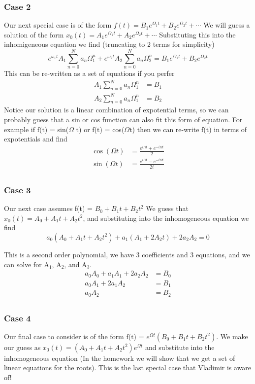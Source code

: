 \documentclass{article}
\newcommand{\be}{\begin{equation}}
\newcommand{\ee}{\end{equation}}
\begin{document}
\subsubsection*{Case 2}
Our next special case is of the form $f(t) = B_1e^{\Omega_1t} + B_2e^{\Omega_2t} + \cdots$
We will guess a solution of the form $x_0(t) = A_1 e^{\Omega_1t} + A_2 e^{\Omega_2t} + \cdots$
Substituting this into the inhomigeneous equation we find  (truncating to 2 terms for simplicity)
\be
e^{\omega_1t} A_1\sum_{n=0}^N a_n \Omega_1^n + e^{\omega_2t} A_2\sum_{n=0}^N a_n \Omega_2^n = B_1e^{\Omega_1 t} + B_2 e^{\Omega_2 t}
\ee
This can be re-written as a set of equations if you perfer
\be
\begin{split}
    A_1 \sum_{n=0}^N a_n\Omega_1^n &= B_1\\
    A_2 \sum_{n=0}^N a_n\Omega_1^n &= B_2
\end{split}
\ee
Notice our solution is a linear combination of expotential terms, so we can probably guess that a sin or cos function can also fit this form of equation.
For example if f(t) = sin($\Omega$ t) or f(t) = cos($\Omega$t) then we can re-write f(t) in terms of expotentials and find
\be
\begin{split}
    \cos(\Omega t) &= \frac{e^{i\Omega t} + e^{-i\Omega t}}{2}\\
    \sin(\Omega t) &= \frac{e^{i\Omega t} - e^{-i\Omega t}}{2i}\\
\end{split}
\ee

\subsubsection*{Case 3}
Our next case assumes f(t) = $B_0 + B_1t + B_2t^2$
We guess that $x_0(t) = A_0 + A_1t + A_2t^2$, and  substituting into the inhomogeneous equation we find
\be
a_0\left(A_0 + A_1t + A_2t^2\right) + a_1\left(A_1 + 2A_2t\right) + 2a_2A_2 = 0
\ee

This is a second order polynomial, we have 3 coefficients and 3 equations, and we can solve for A$_1$, A$_2$, and A$_3$. 
\be
\begin{split}
    a_0A_0 + a_1A_1 + 2a_2A_2 &= B_0\\
    a_0A_1 + 2a_1A_2 &= B_1\\
    a_0A_2 &= B_2\\
\end{split}
\ee

\subsubsection*{Case 4}
Our final case to consider is of the form f(t) = $e^{\Omega t} \left( B_0 + B_1t + B_2t^2 \right)$.
We make our guess as $x_0(t) = \left(A_0 + A_1 t + A_2 t^2\right)e^{\Omega t}$ and substitute into the inhomogeneous equation (In the homework we will show that we get a set of linear equations for the roots). 
This is the last special case that Vladimir is aware of!
\end{document}

